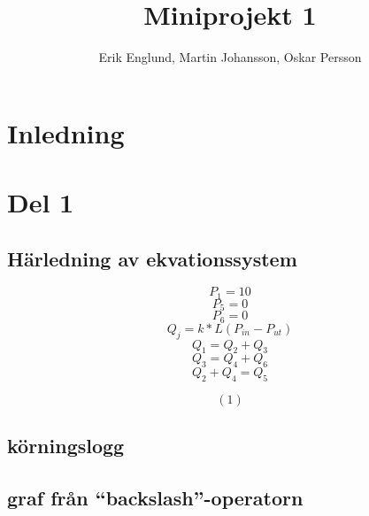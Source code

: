 \documentclass[12pt, a4paper]{report}
\title{Miniprojekt 1}
\author{Erik Englund, Martin Johansson, Oskar Persson}
\begin{document}
\maketitle
\tableofcontents
\section{Inledning}
\section{Del 1}
\subsection{Härledning av ekvationssystem}

$$P_1 = 10$$
$$P_5 = 0$$
$$P_6 = 0$$
$$Q_j = k * L(P_{in} - P_{ut})$$
$$Q_1 = Q_2 + Q_3$$
$$Q_3 = Q_4 + Q_6$$
$$Q_2 + Q_4 = Q_5$$

$$(1) $$

\subsection{körningslogg}

\subsection{graf från ``backslash''-operatorn}
\end{document}

